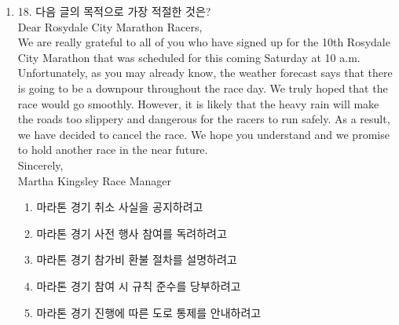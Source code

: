 \documentclass{article}
\begin{document}
\begin{enumerate}[label=\textbf{Q\arabic*.}]
\begin{center}
\end{center}

\begin{enumerate}
    \item (B) – (D) – (C)
    \item (C) – (B) – (D)
    \item (C) – (D) – (B)
    \item (D) – (B) – (C)
    \item (D) – (C) – (B)
\end{enumerate}


\item
18. 다음 글의 목적으로 가장 적절한 것은?
\\
Dear Rosydale City Marathon Racers,\\

We are really grateful to all of you who have signed up for the 10th Rosydale City Marathon that was scheduled for this coming Saturday at 10 a.m. Unfortunately, as you may already know, the weather forecast says that there is going to be a downpour throughout the race day. We truly hoped that the race would go smoothly. However, it is likely that the heavy rain will make the roads too slippery and dangerous for the racers to run safely. As a result, we have decided to cancel the race. We hope you understand and we promise to hold another race in the near future.
\\
Sincerely,\\
Martha Kingsley
Race Manager

\begin{enumerate}
  \item 마라톤 경기 취소 사실을 공지하려고
  \item 마라톤 경기 사전 행사 참여를 독려하려고
  \item 마라톤 경기 참가비 환불 절차를 설명하려고
  \item 마라톤 경기 참여 시 규칙 준수를 당부하려고
  \item 마라톤 경기 진행에 따른 도로 통제를 안내하려고
\end{enumerate}


\end{enumerate}
\end{document}
